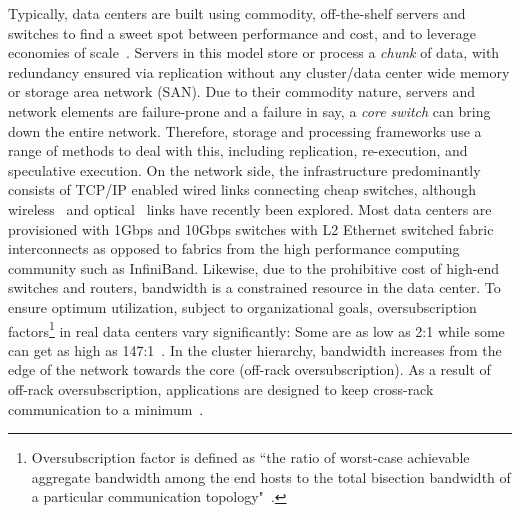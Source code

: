 \documentclass[a4paper,12pt,twoside,openright]{report}
\begin{document}
Typically, data centers are built using commodity, off-the-shelf servers and
switches to find a sweet spot between performance and cost, and to leverage
economies of scale~\cite{Barroso:2003:WSP}. Servers in this model store or
process a \emph{chunk} of data, with redundancy ensured via replication without
any cluster/data center wide memory or storage area network (SAN). Due to their
commodity nature, servers and network elements are failure-prone and a failure
in say, a \emph{core switch} can bring down the entire network. Therefore,
storage and processing frameworks use a range of methods to deal with this,
including replication, re-execution, and speculative execution. On the network
side, the infrastructure predominantly consists of TCP/IP enabled wired links
connecting cheap switches, although wireless~\cite{Halperin:2011:ADC} and
optical~\cite{Wang:2010:CPO,Farrington:2010:HHE} links have recently been
explored. Most data centers are provisioned with 1Gbps and 10Gbps switches with
L2 Ethernet switched fabric interconnects as opposed to fabrics from the high
performance computing community such as InfiniBand. Likewise, due to the
prohibitive cost of high-end switches and routers, bandwidth is a constrained
resource in the data center. To ensure optimum utilization, subject to
organizational goals, oversubscription factors\footnote{Oversubscription factor
is defined as ``the ratio of worst-case achievable aggregate bandwidth among the
end hosts to the total bisection bandwidth of a particular communication
topology"~\cite{Al-Fares:2008:SCD}.} in real data centers vary significantly:
Some are as low as 2:1 while some can get as high as
147:1~\cite{Benson:2010:NTC}. In the cluster hierarchy, bandwidth increases from
the edge of the network towards the core (off-rack oversubscription). As a
result of off-rack oversubscription, applications are designed to keep
cross-rack communication to a minimum~\cite{Dean:2004:MSD}.
\end{document}
